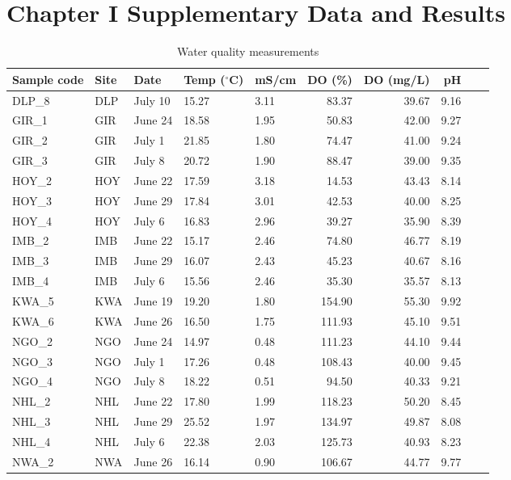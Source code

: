 \section{Chapter I Supplementary Data and Results}

%

\small
\begin{longtable}{lllllrrrrr}
\caption{Water quality measurements}
\label{tab:water_qual}\\
  \hline
  Sample code & Site & Date & Temp ($^{\circ}$C) & mS/cm & DO (\%) & DO (mg/L) & pH \\ 
  \hline
  DLP\_8 & DLP & July 10 & 15.27 & 3.11 & 83.37 & 39.67 & 9.16 \\ 
  GIR\_1 & GIR & June 24 & 18.58 & 1.95 & 50.83 & 42.00 & 9.27 \\ 
  GIR\_2 & GIR & July 1 & 21.85 & 1.80 & 74.47 & 41.00 & 9.24 \\ 
  GIR\_3 & GIR & July 8 & 20.72 & 1.90 & 88.47 & 39.00 & 9.35 \\ 
  HOY\_2 & HOY & June 22 & 17.59 & 3.18 & 14.53 & 43.43 & 8.14 \\ 
  HOY\_3 & HOY & June 29 & 17.84 & 3.01 & 42.53 & 40.00 & 8.25 \\ 
  HOY\_4 & HOY & July 6 & 16.83 & 2.96 & 39.27 & 35.90 & 8.39 \\ 
  IMB\_2 & IMB & June 22 & 15.17 & 2.46 & 74.80 & 46.77 & 8.19 \\ 
  IMB\_3 & IMB & June 29 & 16.07 & 2.43 & 45.23 & 40.67 & 8.16 \\ 
  IMB\_4 & IMB & July 6 & 15.56 & 2.46 & 35.30 & 35.57 & 8.13 \\ 
  KWA\_5 & KWA & June 19 & 19.20 & 1.80 & 154.90 & 55.30 & 9.92 \\ 
  KWA\_6 & KWA & June 26 & 16.50 & 1.75 & 111.93 & 45.10 & 9.51 \\ 
  NGO\_2 & NGO & June 24 & 14.97 & 0.48 & 111.23 & 44.10 & 9.44 \\ 
  NGO\_3 & NGO & July 1 & 17.26 & 0.48 & 108.43 & 40.00 & 9.45 \\ 
  NGO\_4 & NGO & July 8 & 18.22 & 0.51 & 94.50 & 40.33 & 9.21 \\ 
  NHL\_2 & NHL & June 22 & 17.80 & 1.99 & 118.23 & 50.20 & 8.45 \\ 
  NHL\_3 & NHL & June 29 & 25.52 & 1.97 & 134.97 & 49.87 & 8.08 \\ 
  NHL\_4 & NHL & July 6 & 22.38 & 2.03 & 125.73 & 40.93 & 8.23 \\ 
  NWA\_2 & NWA & June 26 & 16.14 & 0.90 & 106.67 & 44.77 & 9.77 \\ 

\end{longtable}
